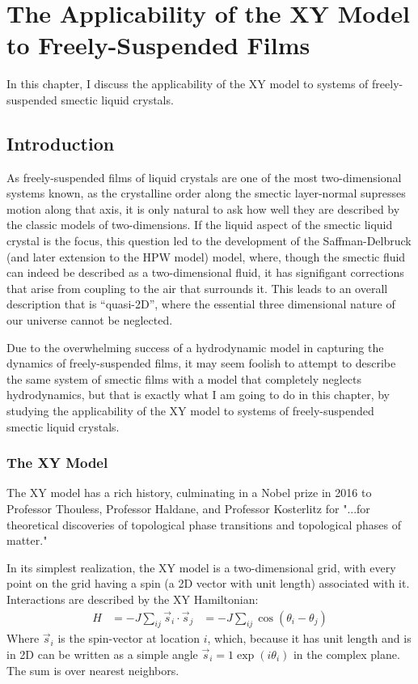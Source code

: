 \documentclass[aagreenthesis]{subfiles}
\begin{document}
\chapter{The Applicability of the XY Model to Freely-Suspended Films}
In this chapter, I discuss the applicability of the XY model to systems of
freely-suspended smectic liquid crystals.
\section{Introduction}
As freely-suspended films of liquid crystals are one of the most
two-dimensional systems known, as the crystalline order along the smectic
layer-normal supresses motion along that axis, it is only natural to ask how
well they are described by the classic models of two-dimensions. If the liquid
aspect of the smectic liquid crystal is the focus, this question led to the
development of the Saffman-Delbruck (and later extension to the HPW model)
model, where, though the smectic fluid can indeed be described as a
two-dimensional fluid, it has signifigant corrections that arise from coupling
to the air that surrounds it. This leads to an overall description that is
``quasi-2D'', where the essential three dimensional nature of our universe
cannot be neglected.

Due to the overwhelming success of a hydrodynamic model in capturing the dynamics of
freely-suspended films, it may seem foolish to attempt to describe the same
system of smectic films with a model that completely neglects hydrodynamics, but
that is exactly what I am going to do in this chapter, by studying the
applicability of the XY model to systems of freely-suspended smectic liquid
crystals.
\subsection{The XY Model}
The XY model has a rich history, culminating in a Nobel prize in 2016 to
Professor Thouless, Professor Haldane, and Professor Kosterlitz for "...for
theoretical discoveries of topological phase transitions and topological
phases of matter."

In its simplest realization, the XY model is a two-dimensional grid, with
every point on the grid having a spin (a 2D vector with unit length) associated
with it. Interactions are described by the XY Hamiltonian:
\begin{align}
    H &= -J\sum_{ij} \vec{s}_i\cdot\vec{s}_j
      &= -J\sum_{ij} \cos(\theta_i-\theta_j)
\end{align}
Where $\vec{s}_i$ is the spin-vector at location $i$, which, because it has unit
length and is in 2D can be written as a simple angle $\vec{s}_i =
1\exp(i\theta_i)$ in the complex plane. The sum is over nearest
neighbors.
\end{document}
